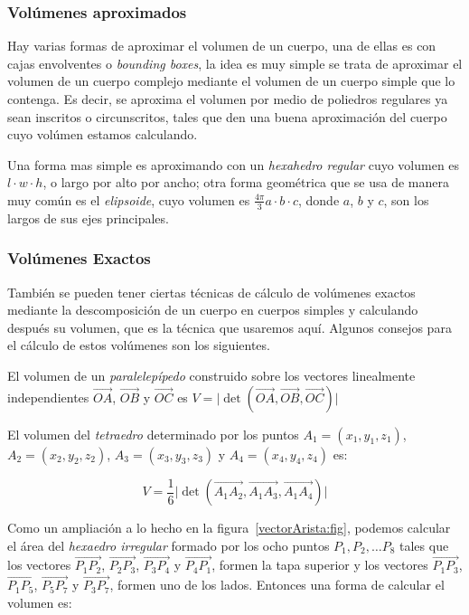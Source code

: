 \subsubsection{Volúmenes aproximados}
Hay varias formas de aproximar el volumen de un cuerpo, una de ellas es con cajas envolventes o \emph{\foreignlanguage{english}{bounding boxes}}, la idea es muy simple se trata de aproximar el volumen de un cuerpo complejo mediante el volumen de un cuerpo simple que lo contenga. Es decir, se aproxima el volumen por medio de poliedros regulares ya sean inscritos o circunscritos, tales que den una buena aproximación del cuerpo cuyo volúmen estamos calculando.

Una forma mas simple es aproximando con un \emph{hexahedro regular} cuyo volumen es $ l \cdot w \cdot h $, o largo por alto por ancho; otra forma geométrica que se usa de manera muy común es el \emph{elipsoide}, cuyo volumen es $ \frac{4\pi}{3} a \cdot   b \cdot  c $, donde $a$, $b$ y $c$, son los largos de sus ejes principales.
\subsubsection{Volúmenes Exactos}
También se pueden tener ciertas técnicas de cálculo de volúmenes exactos mediante la descomposición de un cuerpo en cuerpos simples y calculando después su volumen, que es la técnica que usaremos aquí. Algunos consejos para el cálculo de estos volúmenes son los siguientes.

El volumen de un \emph{paralelepípedo} construido sobre los vectores linealmente independientes $\overrightarrow{OA}$, $\overrightarrow{OB}$ y $\overrightarrow{OC}$ es $V = \vert \det (\overrightarrow{OA}, \overrightarrow{OB}, \overrightarrow{OC} ) \vert $

El volumen del \emph{tetraedro} determinado por los puntos $A_1 = (x_1, y_1, z_1)$, $A_2 = (x_2, y_2, z_2)$, $A_3 = (x_3, y_3, z_3)$ y $A_4 = (x_4, y_4, z_4)$ es:

$$V = \frac{1}{6} \vert \det ( \overrightarrow{A_1 A_2}, \overrightarrow{A_1 A_3}, \overrightarrow{A_1 A_4} ) \vert$$

Como un ampliación a lo hecho en la figura~\ref{vectorArista:fig}, podemos calcular el área del \emph{hexaedro irregular} formado por los ocho puntos $P_1, P_2, \ldots P_8$ tales que los vectores $\overrightarrow{P_1 P_2}$, $\overrightarrow{P_2 P_3}$, $\overrightarrow{P_3 P_4}$ y $\overrightarrow{P_4 P_1}$, formen la tapa superior y los vectores $\overrightarrow{P_1 P_3}$, $\overrightarrow{P_1 P_5}$, $\overrightarrow{P_5 P_7}$ y $\overrightarrow{P_3 P_7}$, formen uno de los lados. Entonces una forma de calcular el volumen es:


